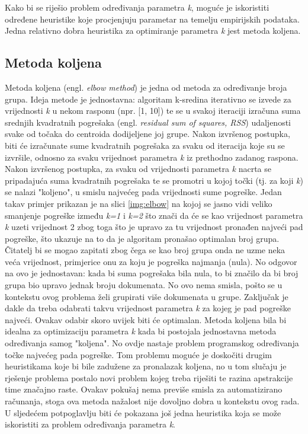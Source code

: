 \documentclass[times, utf8, zavrsni, numeric]{fer}
\begin{document}
Kako bi se riješio problem određivanja parametra \textit{k}, moguće je iskoristiti određene heuristike koje procjenjuju parametar na temelju empirijskih podataka. Jedna relativno dobra heuristika za optimiranje parametra \textit{k} jest metoda koljena.

\subsection{Metoda koljena}
Metoda koljena (engl. \textit{elbow method}) je jedna od metoda za određivanje broja grupa. Ideja metode je jednostavna: algoritam k-sredina iterativno se izvede za vrijednosti \textit{k} u nekom rasponu (npr. [1, 10]) te se u svakoj iteraciji izračuna suma srednjih kvadratnih pogrešaka (engl. \textit{residual sum of squares, RSS}) udaljenosti svake od točaka do centroida dodijeljene joj grupe. Nakon izvršenog postupka, biti će izračunate sume kvadratnih pogrešaka za svaku od iteracija koje su se izvršile, odnosno za svaku vrijednost parametra \textit{k} iz prethodno zadanog raspona. Nakon izvršenog postupka, za svaku od vrijednosti parametra \textit{k} nacrta se pripadajuća suma kvadratnih pogrešaka te se promotri u kojoj točki (tj. za koji \textit{k}) se nalazi "koljeno", u smislu najvećeg pada vrijednosti sume pogreške. Jedan takav primjer prikazan je na slici \ref{img:elbow} na kojoj se jasno vidi veliko smanjenje pogreške između \textit{k=1} i \textit{k=2} što znači da će se kao vrijednost parametra \textit{k} uzeti vrijednost 2 zbog toga što je upravo za tu vrijednost pronađen najveći pad pogreške, što ukazuje na to da je algoritam pronašao optimalan broj grupa. Čitatelj bi se mogao zapitati zbog čega se kao broj grupa onda ne uzme neka veća vrijednost, primjerice onu za koju je pogreška najmanja (nula). No odgovor na ovo je jednostavan: kada bi suma pogrešaka bila nula, to bi značilo da bi broj grupa bio upravo jednak broju dokumenata. No ovo nema smisla, pošto se u kontekstu ovog problema želi grupirati više dokumenata u grupe. Zaključak je dakle da treba odabrati takvu vrijednost parametra \textit{k} za kojeg je pad pogreške najveći. Ovakav odabir skoro uvijek biti će optimalan.
Metoda koljena bila bi idealna za optimizaciju parametra \textit{k} kada bi postojala jednostavna metoda određivanja samog "koljena". No ovdje nastaje problem programskog određivanja točke najvećeg pada pogreške. Tom problemu moguće je doskočiti drugim heuristikama koje bi bile zadužene za pronalazak koljena, no u tom slučaju je rješenje problema postalo novi problem kojeg treba riješiti te razina apstrakcije time značajno raste. Ovakav pokušaj nema previše smisla za automatizirano računanja, stoga ova metoda nažalost nije dovoljno dobra u kontekstu ovog rada. U sljedećem potpoglavlju biti će pokazana još jedna heuristika koja se može iskoristiti za problem određivanja parametra \textit{k}.
\end{document}
